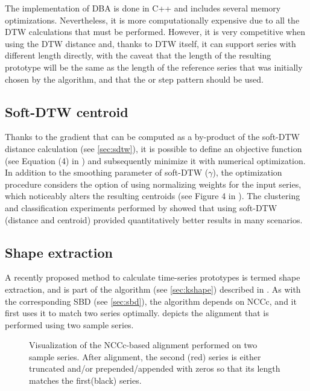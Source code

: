 The \dtwclust{} implementation of DBA is done in C++ and includes several memory optimizations.
Nevertheless, it is more computationally expensive due to all the DTW calculations that must be performed.
However, it is very competitive when using the DTW distance and,
thanks to DTW itself,
it can support series with different length directly,
with the caveat that the length of the resulting prototype will be the same as the length of the reference series that was initially chosen by the algorithm,
and that the  or  step pattern should be used.

\subsection{Soft-DTW centroid}
\label{sec:sdtw-cent}

Thanks to the gradient that can be computed as a by-product of the soft-DTW distance calculation
(see \cref{sec:sdtw}),
it is possible to define an objective function
(see Equation (4) in \citet{cuturi2017})
and subsequently minimize it with numerical optimization.
In addition to the smoothing parameter of soft-DTW ($\gamma$),
the optimization procedure considers the option of using normalizing weights for the input series,
which noticeably alters the resulting centroids
(see Figure 4 in \citet{cuturi2017}).
The clustering and classification experiments performed by \citet{cuturi2017} showed that using soft-DTW (distance and centroid) provided quantitatively better results in many scenarios.

\subsection{Shape extraction}
\label{sec:shape}

A recently proposed method to calculate time-series prototypes is termed shape extraction,
and is part of the \kshape{} algorithm (see \cref{sec:kshape}) described in \citet{paparrizos2015}.
As with the corresponding SBD (see \cref{sec:sbd}),
the algorithm depends on NCCc,
and it first uses it to match two series optimally.
 depicts the alignment that is performed using two sample series.

\begin{figure}[htbp]

{\centering {}

}

\caption{Visualization of the NCCc-based alignment performed on two sample series. After alignment, the second (red) series is either truncated and/or prepended/appended with zeros so that its length matches the first(black) series.}\label{fig:sbd-alignment}
\end{figure}

